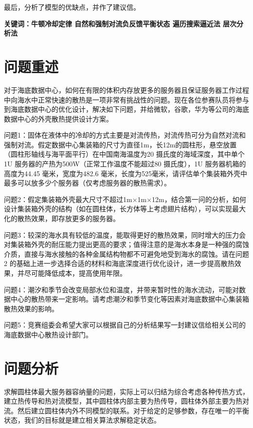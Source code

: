 \documentclass{article}
\begin{document}
	最后，分析了模型的优缺点，并作了建议信。
	\\
	\par
	\noindent\textbf{关键词：\quad 牛顿冷却定律 \quad 自然和强制对流\quad 负反馈平衡状态 \quad 遍历搜索逼近法 \quad 层次分析法}
	\newpage
	
	\tableofcontents
	\thispagestyle{empty}
	\newpage
	\setcounter{page}{1}
	\section{问题重述}
	对于海底数据中心，如何在有限的体积内存放更多的服务器且保证服务器工作过程中向海水中正常快速的散热是一项非常有挑战性的问题。现在各位参赛队员将参与到海底数据中心的优化设计，解决如下问题，并给微软，谷歌，华为等公司的海底数据中心的外壳散热提供设计方案。
	
	问题1：固体在液体中的冷却的方式主要是对流传热，对流传热可分为自然对流和强制对流。假定数据中心集装箱的尺寸为直径1m，长12m的圆柱形，悬空放置（圆柱形轴线与海平面平行）在中国南海温度为20 摄氏度的海域深度，其中单个1U 服务器的产热为500W（正常工作温度不能超过80 摄氏度），1U 服务器机箱的高度为44.45 毫米，宽度为482.6 毫米，长度为525毫米，请评估单个集装箱外壳中最多可以放多少个服务器（仅考虑服务器的散热需求）。
	
	问题2：假定集装箱外壳最大尺寸不超过1m×1m×12m，结合第一问的分析，如何设计集装箱外壳的结构（如在圆柱体，长方体等上考虑翅片结构），可以实现最大化的散热效果，即存放更多的服务器。
	
	问题3：较深的海水具有较低的温度，能取得更好的散热效果，同时增大的压力会对集装箱外壳的耐压能力提出更高的要求；值得注意的是海水本身是一种强的腐蚀介质，直接与海水接触的各种金属结构物都不可避免地受到海水的腐蚀。请在问题2 的基础上进一步选择合适的材料和海底深度进行优化设计，进一步提高散热效果，并尽可能降低成本，提高使用年限。
	
	问题4：潮汐和季节会改变局部水位和温度，并带来暂时性的海水流动，可能对数据中心的散热带来一定影响。请考虑潮汐和季节变化等因素对海底数据中心集装箱散热效果的影响。
	
	问题5：竞赛组委会希望大家可以根据自己的分析结果写一封建议信给相关公司的海底数据中心散热设计部门。
	
	\section{问题分析}
	求解圆柱体最大服务器容纳量的问题，实际上可以归结为综合考虑各种传热方式，建立热传导和热对流模型，其中圆柱体内部主要为热传导，圆柱体外部主要为热对流。然后建立圆柱体内外不同模型的联系。对于给定的足够参数，存在唯一的平衡状态，我们的目标就是建立相关算法求解稳定状态。
	
\end{document}
